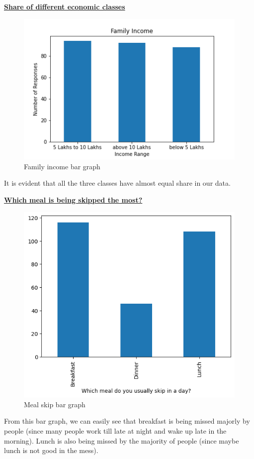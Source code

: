 \documentclass{article}
\begin{document}
\centerline{\underline{\bfseries{Share of different economic classes}}}
\begin{figure}[H]
    \centering
    \includegraphics[scale = 0.7]{bar_familyincome.png}
    \caption{Family income bar graph}  
    \label{fig:bar_familyincome}
\end{figure}
It is evident that all the three classes have almost equal share in our data.\\
\centerline{\underline{\bfseries{Which meal is being skipped the most?}}}
\begin{figure}[H]
    \centering
    \includegraphics[scale = 0.7]{bar_timing_skip.png}
    \caption{Meal skip bar graph}
    \label{fig:bar_timing_skip}
\end{figure}
From this bar graph, we can easily see that breakfast is being missed majorly by people (since many people work till late at night and wake up late in the morning). Lunch is also being missed by the majority of people (since maybe lunch is not good in the mess).\\
\pagebreak
\end{document}
